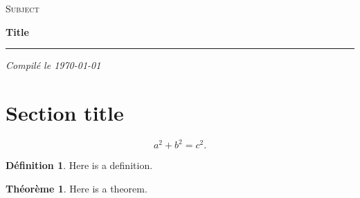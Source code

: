 \documentclass[]{article}
\numberwithin{equation}{section}
\theoremstyle{definition}
\newtheorem{definition}{Définition}
\newtheorem{theorem}{Théorème}
\newcommand{\Chapitre}[2]{%
    \vspace*{1cm}
    {\large\scshape #1\par}
    {\Large\bfseries #2\par}
    \vspace{2pt}
    \rule{\linewidth}{0.8pt}\par
    \vspace{0.3em}
    {\raggedleft\small\textit{Compilé le \today}\par}
    \vspace{1cm}
    \justifying
}
\begin{document}
\setlength{\parindent}{0pt}

\Chapitre{Subject}{Title}

\section{Section title}

\[
a^2 + b^2 = c^2.
\]

\begin{definition}
    Here is a definition. 
\end{definition}

\begin{theorem}
    Here is a theorem. 
\end{theorem}
\end{document}
